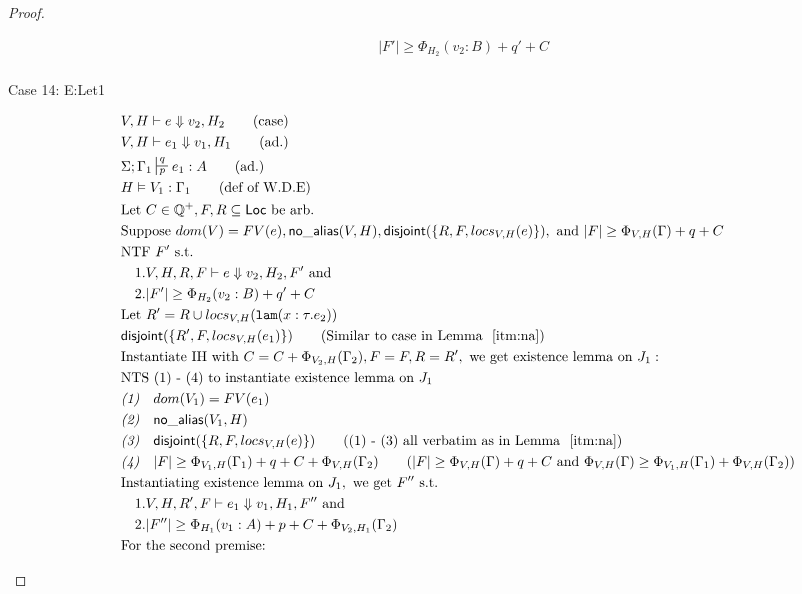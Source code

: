 \documentclass[sigconf]{acmart}
\newcommand{\ms}[1]{\ensuremath{\mathsf{#1}}}
\newcommand{\irl}[1]{\mathtt{#1}}
\newcommand{\na}[1]{\mathsf{no\_alias}(#1)}
\newcommand{\dist}[1]{\mathsf{disjoint}(#1)}
\theoremstyle{definition}
\begin{document}
\begin{proof}
\begin{description}
\begin{align*}
  &|F'| \ge \Phi_{H_2}(v_2:B) + q' + C \tag{from IH}\\
  \end{align*}
  \item [Case 14: E:Let1]
  \begin{align*}
  &V,H \vdash e \Downarrow v_2,H_2 \tag{case}\\
  &V,H \vdash e_1 \Downarrow v_1,H_1 \tag{ad.}\\
  &\Sigma; \Gamma_1 \sststile{p}{q} e_1 : A \tag{ad.}\\
  &H \vDash V_1 : \Gamma_1 \tag{def of W.D.E}\\
  &\text{Let } C \in \mathbb{Q}^+, F,R \subseteq \ms{Loc} \text{ be arb.}\\
  &\text{Suppose }  dom(V) = FV(e),\na{V,H}, \dist{\{R,F,locs_{V,H}(e)\}}, \text{ and } |F| \ge \Phi_{V,H}(\Gamma) + q + C\\
  &\text{NTF } F' \text{ s.t. }\\
  &\quad 1. V,H,R,F \vdash e \Downarrow v_2, H_2,F' \text{ and }\\ 
  &\quad 2. |F'| \ge \Phi_{H_2}(v_2:B) + q' + C\\
  &\text{Let } R' = R \cup locs_{V,H}(\irl{lam}(x : \tau.e_2))\\
  &\dist{\{R',F,locs_{V,H}(e_1)\}} \tag{Similar to case in Lemma $~\ref{itm:na}$}\\
  &\text{Instantiate IH with } C = C + \Phi_{V_2,H}(\Gamma_2), F = F, R = R', \text{ we get existence lemma on } J_1:\\
  &\text{NTS (1) - (4) to instantiate existence lemma on } J_1\\
  &\emph{(1)} \quad dom(V_1) = FV(e_1)\\
  &\emph{(2)} \quad \na{V_1,H}\\
  &\emph{(3)} \quad \dist{\{R,F,locs_{V,H}(e)\}} \tag{(1) - (3) all verbatim as in Lemma $~\ref{itm:na}$}\\
  &\emph{(4)} \quad |F| \ge \Phi_{V_1,H}(\Gamma_1) + q + C + \Phi_{V,H}(\Gamma_2) \tag{$|F| \ge \Phi_{V,H}(\Gamma) + q + C$ and $\Phi_{V,H}(\Gamma) \ge \Phi_{V_1,H}(\Gamma_1) + \Phi_{V,H}(\Gamma_2)$}\\
  &\text{Instantiating existence lemma on } J_1, \text{ we get }  F'' \text{ s.t. }\\
  &\quad 1. V,H,R',F \vdash e_1 \Downarrow v_1, H_1,F'' \text{ and }\\ 
  &\quad 2. |F''| \ge \Phi_{H_1}(v_1:A) + p + C + \Phi_{V_2,H_1}(\Gamma_2)\\
  &\text{For the second premise: }\\

\end{align*}
\end{description}
\end{proof}
\end{document}
